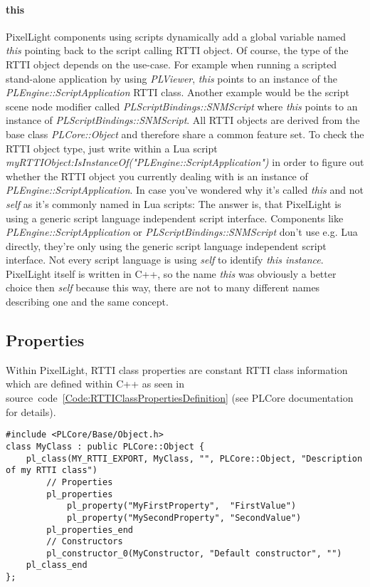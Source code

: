 \paragraph{this}
PixelLight components using scripts dynamically add a global variable named \emph{this} pointing back to the script calling \ac{RTTI} object. Of course, the type of the \ac{RTTI} object depends on the use-case. For example when running a scripted stand-alone application by using \emph{PLViewer}, \emph{this} points to an instance of the \emph{PLEngine::ScriptApplication} \ac{RTTI} class. Another example would be the script scene node modifier called \emph{PLScriptBindings::SNMScript} where \emph{this} points to an instance of \emph{PLScriptBindings::SNMScript}. All \ac{RTTI} objects are derived from the base class \emph{PLCore::Object} and therefore share a common feature set. To check the \ac{RTTI} object type, just write within a Lua script \emph{myRTTIObject:IsInstanceOf("PLEngine::ScriptApplication")} in order to figure out whether the \ac{RTTI} object you currently dealing with is an instance of \emph{PLEngine::ScriptApplication}. In case you've wondered why it's called \emph{this} and not \emph{self} as it's commonly named in Lua scripts: The answer is, that PixelLight is using a generic script language independent script interface. Components like \emph{PLEngine::ScriptApplication} or \emph{PLScriptBindings::SNMScript} don't use e.g. Lua directly, they're only using the generic script language independent script interface. Not every script language is using \emph{self} to identify \emph{this instance}. PixelLight itself is written in C++, so the name \emph{this} was obviously a better choice then \emph{self} because this way, there are not to many different names describing one and the same concept.


\subsection{Properties}
Within PixelLight, \ac{RTTI} class properties are constant \ac{RTTI} class information which are defined within C++ as seen in source~code~\ref{Code:RTTIClassPropertiesDefinition} (see PLCore documentation for details).
\begin{lstlisting}[label=Code:RTTIClassPropertiesDefinition,caption={Defining a new \ac{RTTI} class with properties (C++)}]
#include <PLCore/Base/Object.h>
class MyClass : public PLCore::Object {
	pl_class(MY_RTTI_EXPORT, MyClass, "", PLCore::Object, "Description of my RTTI class")
		// Properties
		pl_properties
			pl_property("MyFirstProperty",  "FirstValue")
			pl_property("MySecondProperty", "SecondValue")
		pl_properties_end
		// Constructors
		pl_constructor_0(MyConstructor, "Default constructor", "")
	pl_class_end
};
\end{lstlisting}

